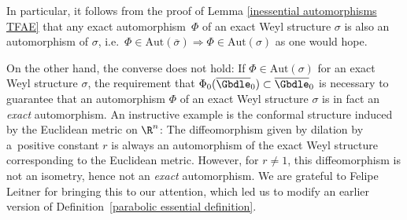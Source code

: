 \begin{Remark} In particular, it follows from the proof of Lemma \ref{inessential automorphisms TFAE} that any exact automor\-phism~$\Phi$ of an exact Weyl structure $\sigma$ is also an automorphism of $\sigma$, i.e.\ $\Phi \in \mathrm{Aut}(\overline{\sigma}) \Rightarrow \Phi \in \mathrm{Aut}(\sigma)$ as one would hope.

 On the other hand, the converse does not hold: If $\Phi \in \mathrm{Aut}(\sigma)$ for an exact Weyl structure $\sigma$, the requirement that $\Phi_0(\overline{\Gbdle}_0) \subset \overline{\Gbdle}_0$ is necessary to guarantee that an automorphism $\Phi$ of an exact Weyl structure $\sigma$ is in fact an \emph{exact} automorphism. An instructive example is the conformal structure induced by the Euclidean metric on $\R^n$: The dif\/feomorphism given by dilation by a~positive constant $r$ is always an automorphism of the exact Weyl structure corresponding to the Euclidean metric. However, for $r \neq 1$, this dif\/feomorphism is not an isometry, hence not an \emph{exact} automorphism. We are grateful to Felipe Leitner for bringing this to our attention, which led us to modify an earlier version of Def\/inition~\ref{parabolic essential definition}.
\end{Remark}
